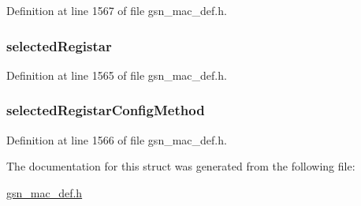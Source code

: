Definition at line 1567 of file gsn\_\-mac\_\-def.h.

\hypertarget{a00138_a6474b96bcd1ccb485c92e5f6893348b4}{
\subsubsection[{selectedRegistar}]{ {\bf selectedRegistar}}}
\label{a00138_a6474b96bcd1ccb485c92e5f6893348b4}


Definition at line 1565 of file gsn\_\-mac\_\-def.h.

\hypertarget{a00138_a4e2e89b26de79aec390592f8db0b09e5}{
\subsubsection[{selectedRegistarConfigMethod}]{ {\bf selectedRegistarConfigMethod}}}
\label{a00138_a4e2e89b26de79aec390592f8db0b09e5}


Definition at line 1566 of file gsn\_\-mac\_\-def.h.



The documentation for this struct was generated from the following file:\begin{DoxyCompactItemize}
\item 
\hyperlink{a00522}{gsn\_\-mac\_\-def.h}\end{DoxyCompactItemize}
